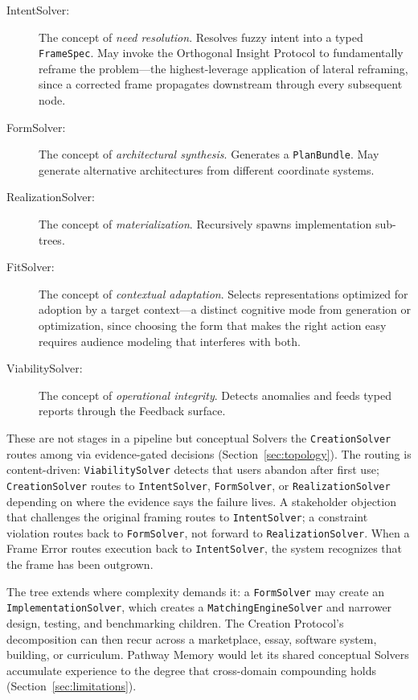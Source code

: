 \documentclass[11pt]{article}
\let\oldtexttt\texttt
\renewcommand{\texttt}[1]{\oldtexttt{\small #1}}
\begin{document}
\begin{description}
\item[IntentSolver:] The concept of \emph{need resolution}. Resolves fuzzy intent into a typed \texttt{FrameSpec}. May invoke the Orthogonal Insight Protocol to fundamentally reframe the problem---the highest-leverage application of lateral reframing, since a corrected frame propagates downstream through every subsequent node.
\item[FormSolver:] The concept of \emph{architectural synthesis}. Generates a \texttt{PlanBundle}. May generate alternative architectures from different coordinate systems.
\item[RealizationSolver:] The concept of \emph{materialization}. Recursively spawns implementation sub-trees.
\item[FitSolver:] The concept of \emph{contextual adaptation}. Selects representations optimized for adoption by a target context---a distinct cognitive mode from generation or optimization, since choosing the form that makes the right action easy requires audience modeling that interferes with both.
\item[ViabilitySolver:] The concept of \emph{operational integrity}. Detects anomalies and feeds typed reports through the Feedback surface.
\end{description}

These are not stages in a pipeline but conceptual Solvers the \texttt{CreationSolver} routes among via evidence-gated decisions (Section~\ref{sec:topology}). The routing is content-driven: \texttt{ViabilitySolver} detects that users abandon after first use; \texttt{CreationSolver} routes to \texttt{IntentSolver}, \texttt{FormSolver}, or \texttt{RealizationSolver} depending on where the evidence says the failure lives. A stakeholder objection that challenges the original framing routes to \texttt{IntentSolver}; a constraint violation routes back to \texttt{FormSolver}, not forward to \texttt{RealizationSolver}. When a Frame Error routes execution back to \texttt{IntentSolver}, the system recognizes that the frame has been outgrown.

The tree extends where complexity demands it: a \texttt{FormSolver} may create an \texttt{ImplementationSolver}, which creates a \texttt{MatchingEngineSolver} and narrower design, testing, and benchmarking children. The Creation Protocol's decomposition can then recur across a marketplace, essay, software system, building, or curriculum. Pathway Memory would let its shared conceptual Solvers accumulate experience to the degree that cross-domain compounding holds (Section~\ref{sec:limitations}).
\end{document}
